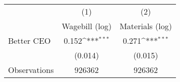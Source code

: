 {
\def\sym#1{\ifmmode^{#1}\else\(^{#1}\)\fi}
\begin{tabular}{l*{2}{c}}
\hline\hline
                    &\multicolumn{1}{c}{(1)}&\multicolumn{1}{c}{(2)}\\
                    &\multicolumn{1}{c}{Wagebill (log)}&\multicolumn{1}{c}{Materials (log)}\\
\hline
Better CEO          &       0.152\sym{***}&       0.271\sym{***}\\
                    &     (0.014)         &     (0.015)         \\
\hline
Observations        &      926362         &      926362         \\
\hline\hline
\end{tabular}
}
